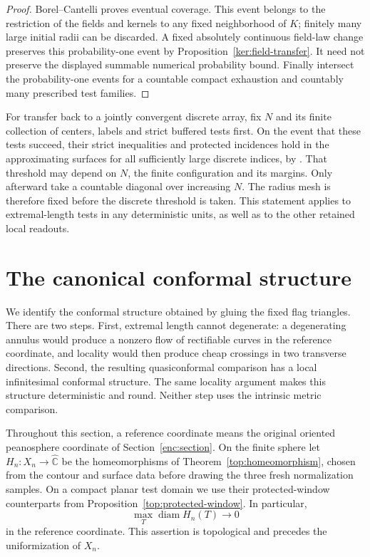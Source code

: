 \documentclass[11pt]{article}
\numberwithin{equation}{section}
\theoremstyle{definition}
\theoremstyle{remark}
\newcommand{\1}{\mathbf 1}
\begin{document}
\begin{proof}
Borel--Cantelli proves eventual coverage.  This event belongs to
the restriction of the fields and kernels to any fixed neighborhood
of \(K\); finitely many large initial radii can be discarded.
A fixed absolutely continuous field-law change preserves this
probability-one event by Proposition~\ref{ker:field-transfer}.
It need not preserve the displayed summable numerical probability
bound.  Finally intersect the probability-one events for a countable
compact exhaustion and countably many prescribed test families.
\end{proof}

For transfer back to a jointly convergent discrete array, fix \(N\)
and its finite collection of centers, labels and strict buffered tests
first. On the event that these tests succeed, their strict inequalities
and protected incidences hold in the approximating surfaces for all
sufficiently large discrete indices, by
. That threshold may depend on
\(N\), the finite configuration and its margins. Only afterward take a
countable diagonal over increasing \(N\). The radius mesh is therefore
fixed before the discrete threshold is taken. This statement applies
to extremal-length tests in any deterministic units, as well as to the
other retained local readouts.

\section{The canonical conformal structure}
\label{conf:section}

We identify the conformal structure obtained by gluing the fixed flag
triangles.  There are two steps.  First, extremal length cannot degenerate:
a degenerating annulus would produce a nonzero flow of rectifiable curves
in the reference coordinate, and locality would then produce cheap
crossings in two transverse directions.  Second, the resulting
quasiconformal comparison has a local infinitesimal conformal structure.
The same locality argument makes this structure deterministic and round.
Neither step uses the intrinsic metric comparison.

Throughout this section, a reference coordinate means the original
oriented peanosphere coordinate of Section~\ref{enc:section}.  On the
finite sphere let
\(H_n:X_n\to\widehat{\mathbb C}\) be the homeomorphisms of
Theorem~\ref{top:homeomorphism}, chosen from the contour and surface
data before drawing the three fresh normalization samples.  On a compact
planar test domain we use their protected-window counterparts from
Proposition~\ref{top:protected-window}.  In particular,
\begin{equation}
 \max_T\operatorname{diam} H_n(T)\longrightarrow0
 \label{conf:topological-mesh}
\end{equation}
in the reference coordinate.  This assertion is topological and precedes
the uniformization of \(X_n\).
\end{document}
